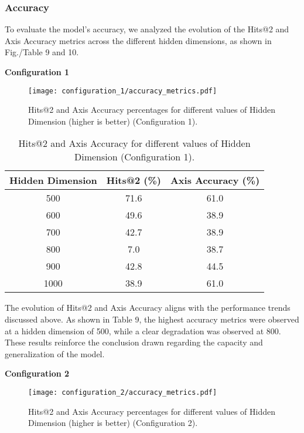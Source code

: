 \subsubsection{Accuracy}
To evaluate the model's accuracy, we analyzed the evolution of the Hits@2 and Axis Accuracy metrics across the different hidden dimensions, as shown in Fig./Table 9 and 10.

\vspace{0.3cm}
\textbf{Configuration 1}
\begin{figure}[H]
    \centering
    \texttt{[image: configuration\_1/accuracy\_metrics.pdf]}
    \caption{Hits@2 and Axis Accuracy percentages for different values of Hidden Dimension (higher is better) (Configuration 1).}  
    \label{fig:accuracy_metrics_c1}               
\end{figure}


\begin{table}[h]
\centering
\caption{Hits@2 and Axis Accuracy for different values of Hidden Dimension (Configuration 1).}
\begin{tabular}{|c|c|c|}
\hline
Hidden Dimension & Hits@2 (\%) & Axis Accuracy (\%)\\
\hline
500  & 71.6 & 61.0\\
600  & 49.6 & 38.9\\
700  & 42.7 & 38.9\\
800  & 7.0 & 38.7\\
900  & 42.8 & 44.5\\
1000  & 38.9 & 61.0\\
\hline
\end{tabular}
\label{tab:accuracy_metrics_table_c1}
\end{table}
The evolution of Hits@2 and Axis Accuracy aligns with the performance trends discussed above. As shown in Table 9, the highest accuracy metrics were observed at a hidden dimension of 500, while a clear degradation was observed at 800. These results reinforce the conclusion drawn regarding the capacity and generalization of the model.

\vspace{0.5cm}
\textbf{Configuration 2}
\begin{figure}[H]
    \centering
    \texttt{[image: configuration\_2/accuracy\_metrics.pdf]}
    \caption{Hits@2 and Axis Accuracy percentages for different values of Hidden Dimension (higher is better) (Configuration 2).}  
    \label{fig:accuracy_metrics_c2} 
\end{figure}

